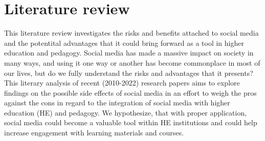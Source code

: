 \documentclass[lettersize,journal]{IEEEtran}
\begin{document}
\section{Literature review}
	This literature review investigates the risks and benefits attached to
    social media and the potentital advantages that it could bring forward as a
    tool in higher education and pedagogy. Social media has made a massive
    impact on society in many ways, and using it one way or another has become
    commonplace in most of our lives, but do we fully understand the risks and
    advantages that it presents? This literary analysis of recent (2010-2022)
    research papers aims to explore findings on the possible side effects of
    social media in an effort to weigh the pros against the cons in regard to
    the integration of social media with higher education (HE) and pedagogy. We
    hypothesize, that with proper application, social media could become a valuable tool within HE institutions and could help increase engagement with learning materials and courses.
\end{document}
